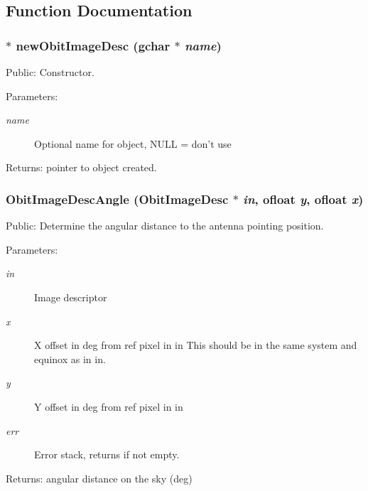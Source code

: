 \subsection{Function Documentation}
\subsubsection{$\ast$ new\-Obit\-Image\-Desc (gchar $\ast$ {\em name})}\label{ObitImageDesc_8c_a6}


Public: Constructor. 

\begin{Desc}
\item[Parameters:]
\begin{description}
\item[{\em name}]Optional name for object, NULL = don't use \end{description}
\end{Desc}
\begin{Desc}
\item[Returns:]pointer to object created. \end{Desc}
\subsubsection{ Obit\-Image\-Desc\-Angle ({\bf Obit\-Image\-Desc} $\ast$ {\em in}, {\bf ofloat} {\em y}, {\bf ofloat} {\em x})}\label{ObitImageDesc_8c_a19}


Public: Determine the angular distance to the antenna pointing position. 

\begin{Desc}
\item[Parameters:]
\begin{description}
\item[{\em in}]Image descriptor \item[{\em x}]X offset in deg from ref pixel in in This should be in the same system and equinox as in in. \item[{\em y}]Y offset in deg from ref pixel in in \item[{\em err}]Error stack, returns if not empty. \end{description}
\end{Desc}
\begin{Desc}
\item[Returns:]angular distance on the sky (deg) \end{Desc}
